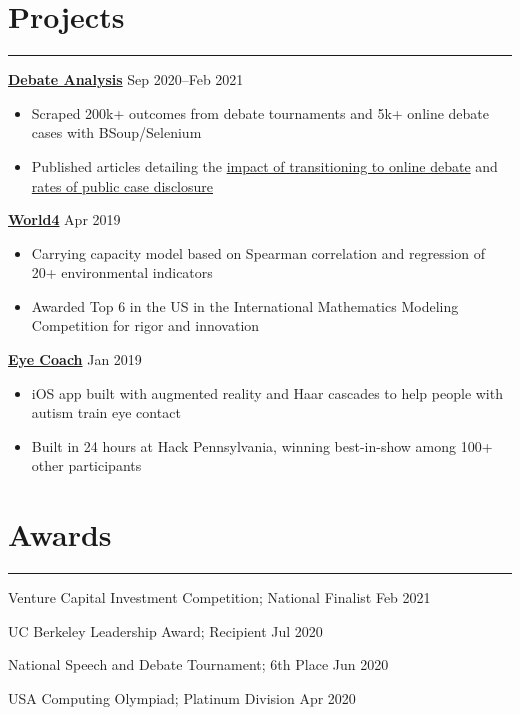 \documentclass[11pt]{article}
\newcommand{\resumesection}[1]{\vspace{-0.6cm}\section*{\color{highlight}#1}\vspace{-0.3cm}\hrule\vspace{0.2cm}}
\begin{document}
\resumesection{Projects}

\textbf{\href{https://github.com/petezh/E-Debate}{Debate Analysis}} \hfill Sep 2020--Feb 2021\par
\begin{itemize}
	\item Scraped 200k+ outcomes from debate tournaments and 5k+ online debate cases with BSoup/Selenium
	\item Published articles detailing the \href{https://www.vbriefly.com/2020/12/31/five-trends-among-e-debate-competitors-by-peter-zhang/}{impact of transitioning to online debate} and \href{https://www.vbriefly.com/2021/01/22/disclosure-in-numbers-by-peter-zhang/}{rates of public case disclosure}
\end{itemize}\vspace{0.1cm} \par

\textbf{\href{https://github.com/gautomdas/IMMC-World4/blob/master/US-9365.pdf}{World4}} \hfill Apr 2019\par
\begin{itemize}
	\item Carrying capacity model based on Spearman correlation and regression of 20+ environmental indicators
	\item Awarded Top 6 in the US in the International Mathematics Modeling Competition for rigor and innovation
\end{itemize}\vspace{0.1cm} \par

\textbf{\href{https://github.com/gautomdas/eye-coach}{Eye Coach}} \hfill Jan 2019 \par
\begin{itemize}
	\item iOS app built with augmented reality and Haar cascades to help people with autism train eye contact
	\item Built in 24 hours at Hack Pennsylvania, winning best-in-show among 100+ other participants
\end{itemize}\vspace{0.1cm} \par

\resumesection{Awards}

Venture Capital Investment Competition; National Finalist \hfill Feb 2021\par
UC Berkeley Leadership Award; Recipient \hfill Jul 2020 \par
National Speech and Debate Tournament; 6th Place \hfill Jun 2020 \par
USA Computing Olympiad; Platinum Division \hfill Apr 2020 \par
\end{document}
